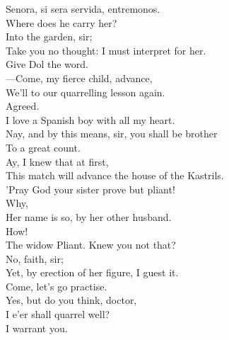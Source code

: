 \documentclass[a4paper,oneside]{memoir}
\begin{document}
\begin{drama*}
\surlyspeaks Senora, si sera servida, entremonos.\\
\kastrilspeaks Where does he carry her?\\
\facespeaks {} Into the garden, sir;\\
Take you no thought: I must interpret for her.\\
\subtlespeaks Give Dol the word.\\
 ---Come, my fierce child, advance,\\
We'll to our quarrelling lesson again.\\
\kastrilspeaks {} Agreed.\\
I love a Spanish boy with all my heart.\\
\subtlespeaks Nay, and by this means, sir, you shall be brother\\
To a great count.\\
\kastrilspeaks {} Ay, I knew that at first,\\
This match will advance the house of the Kastrils.\\
\subtlespeaks 'Pray God your sister prove but pliant!\\
\kastrilspeaks {} Why,\\
Her name is so, by her other husband.\\
\subtlespeaks {} How!\\
\kastrilspeaks The widow Pliant. Knew you not that?\\
\subtlespeaks {} No, faith, sir;\\
Yet, by erection of her figure, I guest it.\\
Come, let's go practise.\\
\kastrilspeaks {} Yes, but do you think, doctor,\\
I e'er shall quarrel well?\\
\subtlespeaks {} I warrant you.\\
\scene


\end{drama*}
\end{document}

